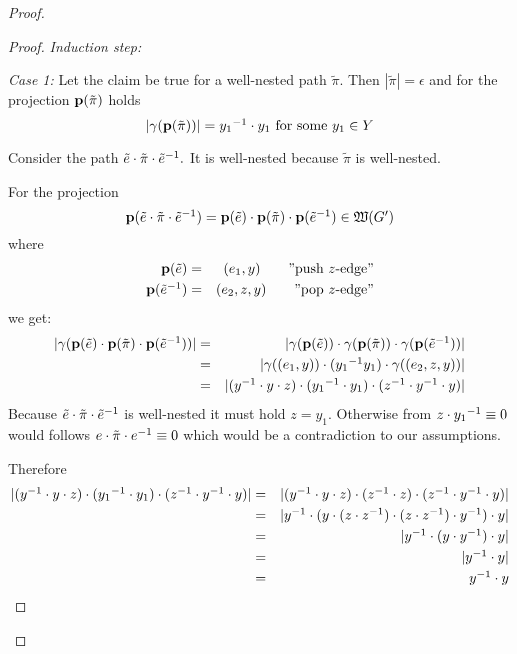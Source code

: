 \begin{proof}
\begin{proof}
\medskip
{\em Induction step:}

{\em Case 1:} Let the claim be true for a well-nested path $\tilde{\pi}$. Then
$|\tilde{\pi}| = \epsilon$ and for the projection $\mathbf{p}({\tilde{\pi}})$ holds
\[ |\gamma(\mathbf{p}({\tilde{\pi}}))| = \mbox{${y_1}^{-1}$} \cdot y_1\text{ for some }y_1 \in Y
\]

Consider the path $\tilde e \cdot \tilde{\pi} \cdot \mbox{${\tilde e}^{-1}$}.$ It is
well-nested because $\tilde\pi$ is well-nested.

For the projection
\[ \mathbf{p}({\tilde e \cdot \tilde{\pi} \cdot \mbox{${\tilde e}^{-1}$}}) = \mathbf{p}({\tilde e})
\cdot \mathbf{p}({\tilde{\pi}}) \cdot \mathbf{p}({\mbox{${\tilde e}^{-1}$}}) \in \mbox{$\mathfrak{W}({G'})$} \]
where
\begin{eqnarray*}
\mathbf{p}({\tilde e}) &=& (e_1, y) \qquad\text{''push $z$-edge''}\\
\mathbf{p}({\mbox{${\tilde e}^{-1}$}}) &=& (e_2, z, y) \qquad\text{''pop $z$-edge''}\\
\end{eqnarray*}
we get:
\begin{eqnarray*}
|\gamma(\mathbf{p}({\tilde e}) \cdot \mathbf{p}({\tilde{\pi}}) \cdot \mathbf{p}({\mbox{${\tilde
e}^{-1}$}}))|&=& |\gamma(\mathbf{p}({\tilde e})) \cdot \gamma(\mathbf{p}({\tilde{\pi}})) \cdot
\gamma(\mathbf{p}({\mbox{${\tilde e}^{-1}$}}))| \\
&=&|\gamma((e_1, y)) \cdot  (\mbox{${y_1}^{-1}$} y_1) \cdot \gamma((e_2, z, y))| \\
&=& |(\mbox{${y}^{-1}$} \cdot y \cdot z) \cdot (\mbox{${y_1}^{-1}$} \cdot y_1) \cdot (\mbox{${z}^{-1}$} \cdot
\mbox{${y}^{-1}$} \cdot y)| \\
\end{eqnarray*}
Because $\tilde e \cdot \tilde{\pi} \cdot \mbox{${\tilde e}^{-1}$}$ is well-nested it
must hold $z = y_1$. Otherwise from $z \cdot \mbox{${y_1}^{-1}$} \equiv 0$ would
follows $e \cdot \tilde{\pi} \cdot \mbox{${e}^{-1}$} \equiv 0$ which would be a 
contradiction to our assumptions.

Therefore
\begin{eqnarray*}
|(\mbox{${y}^{-1}$} \cdot y \cdot z) \cdot (\mbox{${y_1}^{-1}$} \cdot y_1) \cdot (\mbox{${z}^{-1}$} \cdot
\mbox{${y}^{-1}$} \cdot y)| &=&
|(\mbox{${y}^{-1}$} \cdot y \cdot z) \cdot (\mbox{${z}^{-1}$} \cdot z) \cdot (\mbox{${z}^{-1}$} \cdot
\mbox{${y}^{-1}$} \cdot y)| \\
&=& |\mbox{${y}^{-1}$} \cdot (y \cdot (z \cdot \mbox{${z}^{-1}$}) \cdot (z \cdot \mbox{${z}^{-1}$}) \cdot
\mbox{${y}^{-1}$}) \cdot y| \\
&=& |\mbox{${y}^{-1}$} \cdot (y \cdot \mbox{${y}^{-1}$}) \cdot y| \\
&=& |\mbox{${y}^{-1}$} \cdot y| \\
&=& \mbox{${y}^{-1}$}  \cdot y
\end{eqnarray*}


\end{proof}
\end{proof}
